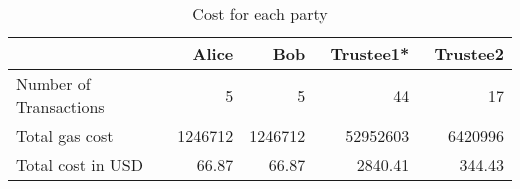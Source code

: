 
\begin{table}[t]
		\centering
	\begin{tabular}{|l|r|r|r|r|}
		\hline
		& ~\textbf{Alice} &  ~\textbf{Bob} & ~\textbf{Trustee1*}  & ~\textbf{Trustee2}  \\ \hline
		Number of Transactions	& 5 &5  &44  &17  \\ \hline
		Total gas cost	& 1246712 &  1246712& 52952603  & 6420996 \\ \hline
		Total cost in USD	&  66.87& 66.87 &2840.41  & 344.43 \\ \hline
	\end{tabular}
	\caption{Cost for each party} 
	\label{tab:participantcost}
\end{table}